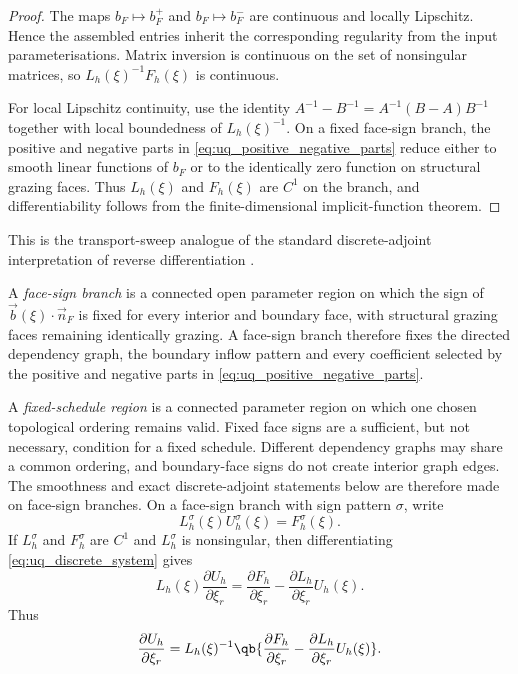 \documentclass[final]{amsart}
\begin{document}
\begin{proof}
The maps $b_F\mapsto b_F^+$ and $b_F\mapsto b_F^-$ are continuous and
locally Lipschitz. Hence the assembled entries inherit the corresponding
regularity from the input parameterisations. Matrix inversion is
continuous on the set of nonsingular matrices, so
$L_h(\xi)^{-1}F_h(\xi)$ is continuous.

For local Lipschitz continuity, use the identity
$A^{-1}-B^{-1}=A^{-1}(B-A)B^{-1}$ together with local boundedness of
$L_h(\xi)^{-1}$. On a fixed
face-sign branch, the positive and negative parts in
\eqref{eq:uq_positive_negative_parts} reduce either to smooth linear
functions of $b_F$ or to the identically zero function on structural
grazing faces. Thus $L_h(\xi)$ and $F_h(\xi)$ are $C^1$ on the branch,
and differentiability follows from the finite-dimensional
implicit-function theorem.
\end{proof}
This is the transport-sweep analogue of the standard discrete-adjoint
interpretation of reverse differentiation
\cite{FarrellEtAl2013DolfinAdjoint,Giles2008MatrixDerivatives}.

A \emph{face-sign branch} is a connected open parameter region on which
the sign of
$\vec b(\xi)\cdot\vec n_F$
is fixed for every interior and boundary face, with structural grazing
faces remaining identically grazing. A face-sign branch therefore fixes
the directed dependency graph, the boundary inflow pattern and every
coefficient selected by the positive and negative parts in
\eqref{eq:uq_positive_negative_parts}.

A \emph{fixed-schedule region} is a connected parameter region on
which one chosen topological ordering remains valid. Fixed face signs
are a sufficient, but not necessary, condition for a fixed schedule.
Different dependency graphs may share a common ordering, and
boundary-face signs do not create interior graph edges. The smoothness
and exact discrete-adjoint statements below are therefore made on
face-sign branches. On a face-sign branch with sign pattern $\sigma$,
write
\begin{equation}
L_h^\sigma(\xi)U_h^\sigma(\xi)
=
F_h^\sigma(\xi).
\label{eq:uq_branch_discrete_system}
\end{equation}
If $L_h^\sigma$ and $F_h^\sigma$ are $C^1$ and $L_h^\sigma$ is
nonsingular, then differentiating \eqref{eq:uq_discrete_system} gives
\begin{equation}
  L_h(\xi)
  \frac{\partial U_h}{\partial \xi_r}
  =
  \frac{\partial F_h}{\partial \xi_r}
  -
  \frac{\partial L_h}{\partial \xi_r}U_h(\xi).
  \label{eq:uq_forward_sensitivity_system}
\end{equation}
Thus
\begin{equation}
  \frac{\partial U_h}{\partial \xi_r}
  =
  L_h(\xi)^{-1}
  \qb{
    \frac{\partial F_h}{\partial \xi_r}
    -
    \frac{\partial L_h}{\partial \xi_r}U_h(\xi)
  }.
  \label{eq:uq_forward_sensitivity}
\end{equation}
\end{document}
